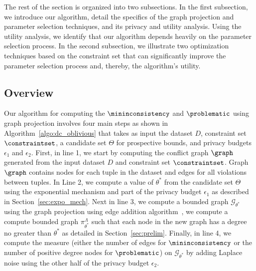 The rest of the section is organized into two subsections. In the first subsection, we introduce our algorithm, detail the specifics of the graph projection and parameter selection techniques, and its privacy and utility analysis. Using the utility analysis, we identify that our algorithm depends heavily on the parameter selection process. In the second subsection, we illustrate two optimization techniques based on the constraint set that can significantly improve the parameter selection process and, thereby, the algorithm's utility. 



\subsection{Overview}\label{sec:dc_oblivious_algo}

Our algorithm for computing the $\mininconsistency$ and $\problematic$ using graph projection involves four main steps as shown in Algorithm~\ref{algo:dc_oblivious} that takes as input the dataset $D$, constraint set $\constraintset$, a candidate set $\Theta$ for prospective bounds, and privacy budgets $\epsilon_1$ and $\epsilon_2$. First, in line 1, we start by computing the conflict graph $\graph$ generated from the input dataset $D$ and constraint set $\constraintset$. Graph $\graph$ contains nodes for each tuple in the dataset and edges for all violations between tuples. In Line 2, we compute a value of $\theta^*$ from the candidate set $\Theta$ using the exponential mechanism and part of the privacy budget $\epsilon_1$ as described in Section~\ref{sec:expo_mech}. Next in line 3, we compute a bounded graph $\mathcal{G}_{\theta^*}$ using the graph projection using edge addition algorithm~\cite{day2016publishing}, we compute a compute bounded graph $\pi_{\theta^*}^\Lambda$ such that each node in the new graph has a degree no greater than $\theta^*$ as detailed in Section~\ref{sec:prelim}. Finally, in line 4, we compute the measure (either the number of edges for $\mininconsistency$ or the number of positive degree nodes for $\problematic$) on $\mathcal{G}_{\theta^*}$ by adding Laplace noise using the other half of the privacy budget $\epsilon_2$. 



